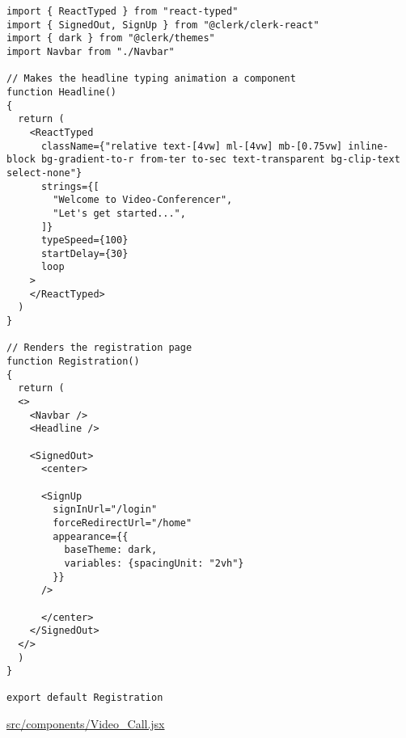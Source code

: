 \begin{verbatim}
import { ReactTyped } from "react-typed"
import { SignedOut, SignUp } from "@clerk/clerk-react"
import { dark } from "@clerk/themes"
import Navbar from "./Navbar"

// Makes the headline typing animation a component
function Headline()
{
  return (
    <ReactTyped
      className={"relative text-[4vw] ml-[4vw] mb-[0.75vw] inline-block bg-gradient-to-r from-ter to-sec text-transparent bg-clip-text select-none"}
      strings={[
        "Welcome to Video-Conferencer",
        "Let's get started...",
      ]}
      typeSpeed={100}
      startDelay={30}
      loop
    >
    </ReactTyped>
  )
}

// Renders the registration page
function Registration()
{
  return (
  <>
    <Navbar />
    <Headline />

    <SignedOut>
      <center>

  	  <SignUp
  	    signInUrl="/login"
  	    forceRedirectUrl="/home"
  	    appearance={{
  	      baseTheme: dark,
  	      variables: {spacingUnit: "2vh"}
  	    }}
  	  />

      </center>
    </SignedOut>
  </>
  )
}

export default Registration
\end{verbatim}

\underline{src/components/Video\_Call.jsx}


